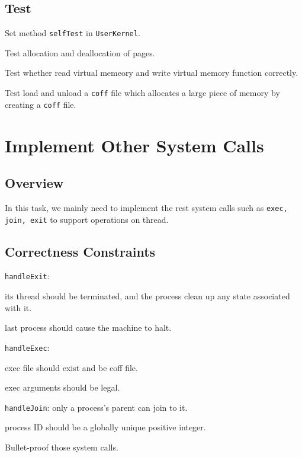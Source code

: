 \documentclass{article}
\begin{document}
\subsection{Test}
Set method \texttt{selfTest} in \texttt{UserKernel}.
\begin{compactitem}
\item Test allocation and deallocation of pages.
\item Test whether read virtual memeory and write virtual memory function correctly.
\item Test load and unload a \texttt{coff} file which allocates a large piece of memory by creating a \texttt{coff} file.
\end{compactitem}
\section{Implement Other System Calls}
\subsection{Overview}
In this task, we mainly need to implement the rest system calls such as \texttt{exec, join, exit} to support operations on thread.
\subsection{Correctness Constraints}
\begin{compactitem}
\item \texttt{handleExit}:
\begin{compactitem}[$\bullet$]
\item its thread should be terminated, and the process clean up any state associated with it.
\item last process should cause the machine to halt.
\end{compactitem}
\item \texttt{handleExec}:
\begin{compactitem}[$\bullet$]
\item exec file should exist and be coff file.
\item exec arguments should be legal.
\end{compactitem}
\item \texttt{handleJoin}: only a process's parent can join to it.
\item process ID should be a globally unique positive integer.
\item Bullet-proof those system calls.
\end{compactitem}
\end{document}
